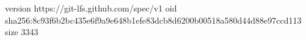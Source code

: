version https://git-lfs.github.com/spec/v1
oid sha256:8c93f6b2bc435e6f9a9e648b1efe83dcb8d6200b00518a580d44d88e97ccd113
size 3343
